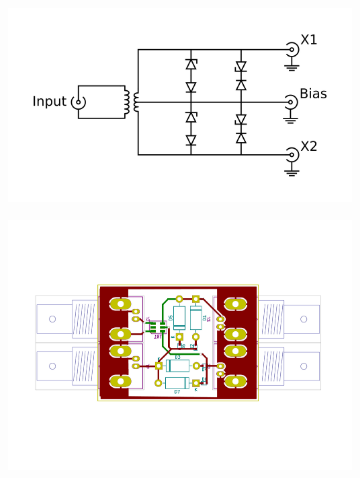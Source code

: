 \begin{figure}
	\centering
	\begin{subfigure}{0.4\textwidth}
		\centering
		\includegraphics[width=\textwidth]{Chapters/Deflection/circuit_CTT}
		\caption{}
		\label{fig:circuit_ctt}
	\end{subfigure}
	\hspace{0.1\textwidth}
	\begin{subfigure}{0.4\textwidth}
		\centering
		\includegraphics[width=\textwidth]{Chapters/Deflection/PCB_CTT3}
		\caption{}
		\label{fig:PCB_CTT}
	\end{subfigure}
	\caption{}
	\label{fig:CTT}
\end{figure}



